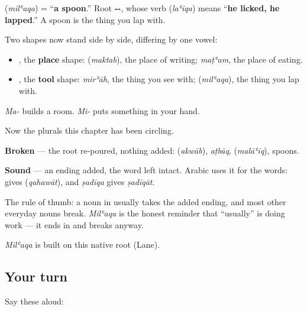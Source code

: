 \begin{cousinweb}
\textbf{} (\emph{milʿaqa}) = \textquotedblleft{}\textbf{a spoon}.\textquotedblright{} Root \textbf{--}, whose verb \textbf{} (\emph{laʿiqa}) means \textquotedblleft{}\textbf{he licked, he lapped}.\textquotedblright{} A spoon is the thing you lap with.

Two shapes now stand side by side, differing by one vowel:

\begin{itemize}
\raggedright
  \item \textbf{}, the \textbf{place} shape: \textbf{} (\emph{maktab}), the place of writing; \emph{maṭʿam}, the place of eating.
  \item \textbf{}, the \textbf{tool} shape: \emph{mirʾāh}, the thing you see with; \textbf{} (\emph{milʿaqa}), the thing you lap with.
\end{itemize}

\emph{Ma-} builds a room. \emph{Mi-} puts something in your hand.

Now the plurals this chapter has been circling.

\textbf{Broken} — the root re-poured, nothing added: \textbf{} (\emph{akwāb}), \emph{aṭbāq}, \textbf{} (\emph{malāʿiq}), spoons.

\textbf{Sound} — an ending added, the word left intact. Arabic uses it for the \textbf{} words: \textbf{} gives \textbf{} (\emph{qahawāt}), and \emph{ṣadīqa} gives \emph{ṣadīqāt}.

The rule of thumb: a noun in \textbf{} usually takes the added ending, and most other everyday nouns break. \emph{Milʿaqa} is the honest reminder that \textquotedblleft{}usually\textquotedblright{} is doing work — it ends in \textbf{} and breaks anyway.

\emph{Milʿaqa} is built on this native root (Lane).
\end{cousinweb}

\subsection*{Your turn}
Say these aloud:

